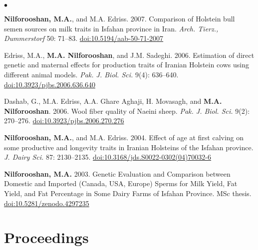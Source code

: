 \documentclass[margin,line]{res}
\newenvironment{list2}{
  \begin{list}{$\bullet$}{%
      \setlength{\itemsep}{0in}
      \setlength{\parsep}{0in} \setlength{\parskip}{0in}
      \setlength{\topsep}{0in} \setlength{\partopsep}{0in}
      \setlength{\leftmargin}{0.2in}}}{\end{list}}
\begin{document}
\begin{resume}
\begin{list2}
\item {\bf Nilforooshan, M.A.}, and M.A. Edriss. 2007. Comparison of Holstein bull semen sources on milk traits in Isfahan province in Iran. {\em Arch. Tierz., Dummerstorf} 50: 71--83. \href{https://doi.org/10.5194/aab-50-71-2007}{doi:10.5194/aab-50-71-2007}
\item Edriss, M.A., {\bf M.A. Nilforooshan}, and J.M. Sadeghi. 2006. Estimation of direct genetic and maternal effects for production traits of Iranian Holstein cows using different animal models. {\em Pak. J. Biol. Sci.} 9(4): 636--640. \href{https://doi.org/10.3923/pjbs.2006.636.640}{doi:10.3923/pjbs.2006.636.640}
\item Dashab, G., M.A. Edriss, A.A. Ghare Aghaji, H. Movasagh, and {\bf M.A. Nilforooshan}. 2006. Wool fiber quality of Naeini sheep. {\em Pak. J. Biol. Sci.} 9(2): 270--276. \href{https://doi.org/10.3923/pjbs.2006.270.276}{doi:10.3923/pjbs.2006.270.276}
\item {\bf Nilforooshan, M.A.}, and M.A. Edriss. 2004. Effect of age at first calving on some productive and longevity traits in Iranian Holsteins of the Isfahan province. {\em J. Dairy Sci.} 87: 2130--2135. \href{https://doi.org/10.3168/jds.S0022-0302(04)70032-6}{doi:10.3168/jds.S0022-0302(04)70032-6}
\item {\bf Nilforooshan, M.A.} 2003. Genetic Evaluation and Comparison between Domestic and Imported (Canada, USA, Europe) Sperms for Milk Yield, Fat Yield, and Fat Percentage in Some Dairy Farms of Isfahan Province. MSc thesis. \href{https://doi.org/10.5281/zenodo.4297235}{doi:10.5281/zenodo.4297235}
\end{list2}
\section{\sc Proceedings}


\end{resume}
\end{document}
